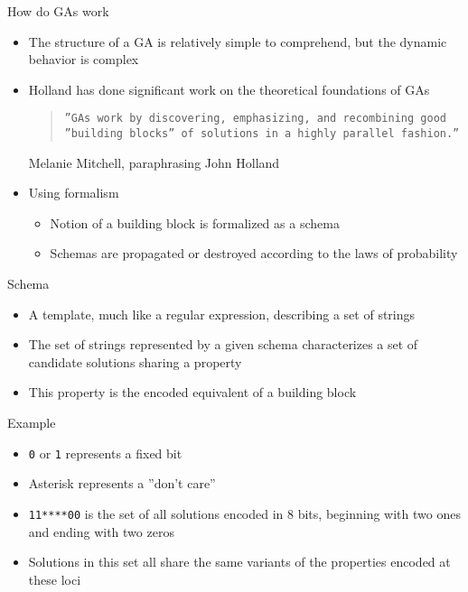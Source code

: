 \documentclass[%
pdf,
colorBG,
slideColor,
tcrico,
]{prosper}
\begin{document}

\begin{slide}{How do GAs work} 
\tiny
\begin{itemize}
\item The structure of a GA is relatively simple to comprehend, but the dynamic behavior is complex
\item Holland has done significant work on the theoretical foundations of GAs
\begin{quote}
\texttt{''GAs work by discovering, emphasizing, and recombining good ''building blocks'' of solutions in a highly parallel fashion.''
}\end{quote}
Melanie Mitchell, paraphrasing John Holland

\item  Using formalism
\begin{itemize}
\item Notion of a building block is formalized as a schema
\item Schemas are propagated or destroyed according to the laws of probability 
\end{itemize}
\end{itemize}

\end{slide}


\begin{slide}{ Schema}
\begin{itemize}
\item A template, much like a regular expression, describing a set of strings
\item The set of strings represented by a given schema characterizes a set of candidate solutions sharing a property
\item This property is the encoded equivalent of a building block
\end{itemize}
\end{slide}


\begin{slide}{ Example }  
\begin{itemize}
\item \texttt{0} or \texttt{1} represents a fixed bit
\item  Asterisk represents a ''don't care''
\item  \texttt{11****00} is the set of all solutions encoded in 8 bits, beginning with two ones and ending with two zeros
\item Solutions in this set all share the same variants of the properties encoded at these loci
\end{itemize}
\end{slide}
\end{document}
